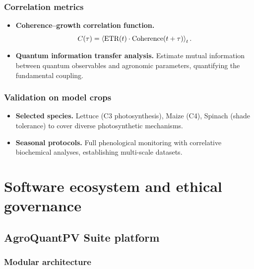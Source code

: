 \documentclass[12pt, a4paper]{article}
\begin{document}
\subsubsection{Correlation metrics}

\begin{itemize}
    \item \textbf{Coherence–growth correlation function.}
        \begin{equation}
            C(\tau) = \ev {\text{ETR}(t) \cdot \text{Coherence}(t+\tau)}_t .
        \end{equation}
    
    \item \textbf{Quantum information transfer analysis.} Estimate mutual information between quantum observables and agronomic parameters, quantifying the fundamental coupling.
\end{itemize}

\subsubsection{Validation on model crops}

\begin{itemize}
    \item \textbf{Selected species.} Lettuce (C3 photosynthesis), Maize (C4), Spinach (shade tolerance) to cover diverse photosynthetic mechanisms.
    
    \item \textbf{Seasonal protocols.} Full phenological monitoring with correlative biochemical analyses, establishing multi-scale datasets.
\end{itemize}

\section{Software ecosystem and ethical governance}
\label{sec:software}

\subsection{AgroQuantPV Suite platform}

\subsubsection{Modular architecture}
\end{document}
